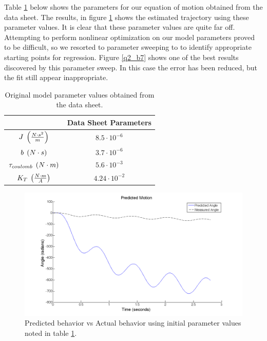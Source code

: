 \documentclass{article}
\theoremstyle{plain}
\theoremstyle{definition}
\theoremstyle{remark}
\begin{document}
Table \ref{q2_b1} below shows the parameters for our equation of motion obtained from the data sheet.  The results, in figure \ref{q2_b2} shows the estimated trajectory using these parameter values.  It is clear that these parameter values are quite far off.  Attempting to perform nonlinear optimization on our model parameters proved to be difficult, so we resorted to parameter sweeping to to identify appropriate starting points for regression.  Figure \ref{q2_b7} shows one of the best results discovered by this parameter sweep.  In this case the error has been reduced, but the fit still appear inappropriate.  \\

\begin{table}[htb]
\begin{center}
    \begin{tabular}{|c|c|}
        \hline
        ~                                                      & Data Sheet Parameters        \\ \hline
        $J \hspace{0.1cm} \left( \frac{N\cdot s^2}{m} \right)$     & $8.5 \cdot 10^{-6} $               \\ 
        $b \hspace{0.1cm} \left( N \cdot s \right) $               & $3.7\cdot 10^{-6} $                 \\ 
        $\tau_{coulomb} \hspace{0.1cm} \left( N \cdot m \right)$           & $5.6 \cdot 10^{-3}$  \\ 
        $K_{T} \hspace{0.1cm} \left( \frac{N\cdot m}{A} \right) $ & $4.24 \cdot 10^{-2}$             \\
        \hline
    \end{tabular}
\caption{Original model parameter values obtained from the data sheet.}
\label{q2_b1}
\end{center}
\end{table}

\begin{figure}[htb]
\begin{center}
\includegraphics[width = 14cm]{initialModel.png}
\caption{Predicted behavior vs Actual behavior using initial parameter values noted in table \ref{q2_b1}.}
\label{q2_b2}
\end{center}
\end{figure}
\end{document}
